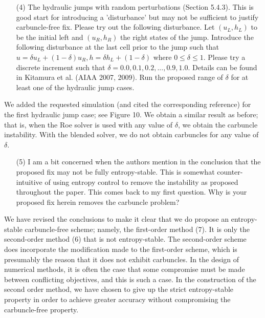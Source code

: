 \documentclass[english,11pt]{article}
\begin{document}
\bigskip
{\color{red}
  \begin{itemize}
  \item[(4)]
    The hydraulic jumps with random perturbations (Section 5.4.3). This is good start for introducing a
    'disturbance' but may not be sufficient to justify carbuncle-free fix. Please try out the following
    disturbance. Let $(u_L, h_L)$ to be the initial left and $(u_R, h_R)$ the right states of the jump. 
    Introduce the following disturbance at the last cell prior to the jump such that 
    $u=\delta { u_L} + (1-\delta)u_R, h=\delta {h_L} + (1-\delta)$ where $0\leq{\delta}\leq{1}$. 
    Please try a discrete increment such that $\delta = 0.0, 0.1, 0.2,...,0.9, 1.0$. 
    Details can be found in Kitamura et al. (AIAA 2007, 2009). Run the proposed range of $\delta$
    for at least one of the hydraulic jump cases.
  \end{itemize}
}
\noindent
We added the requested simulation (and cited the corresponding reference) 
for the first hydraulic jump case; see Figure 10. We obtain a similar result as before; that is, 
when the Roe solver is used with any value of $\delta$, we obtain the carbuncle instability. 
With the blended solver, we do not obtain carbuncles for any value of $\delta$.

\bigskip
{\color{red}
  \begin{itemize}
  \item[(5)]
    I am a bit concerned when the authors mention in the conclusion that the proposed fix may not be fully
    entropy-stable. This is somewhat counter-intuitive of using entropy control to remove the instability as
    proposed throughout the paper. This comes back to my first question. Why is your proposed fix herein
    removes the carbuncle problem?
  \end{itemize}
}
\noindent
We have revised the conclusions to make it clear that we do propose an entropy-stable carbuncle-free scheme;
namely, the first-order method (7).  It is only the second-order method (6) that is not entropy-stable.
The second-order scheme does incorporate the modification made to the first-order scheme, which is
presumably the reason that it does not exhibit carbuncles.
In the design of numerical methods, it is often the case that some compromise must be made between conflicting
objectives, and this is such a case.  In the construction of the second order
method, we have chosen to give up the strict entropy-stable property in order
to achieve greater accuracy without compromising the carbuncle-free property.
\end{document}
